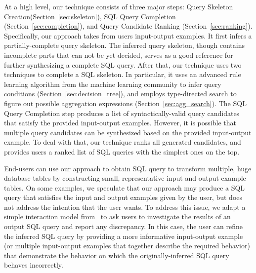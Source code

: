 At a high level, our technique consists of three major steps: Query Skeleton
Creation(Section~\ref{sec:skeleton}), SQL Query Completion
(Section~\ref{sec:completion}), and Query Candidate Ranking (Section~\ref{sec:ranking}).
Specifically, our approach takes from users input-output examples. It first infers
a partially-complete query skeleton. The inferred query skeleton, though contains
incomplete parts that can not be yet decided, serves as a good reference
for further synthesizing a complete SQL query.
After that, our technique uses two techniques to complete a SQL skeleton.
In particular, it uses an advanced rule learning algorithm from the machine
learning community to infer query conditions (Section~\ref{sec:decision_tree}), and
 employs type-directed search to figure out possible aggregation
expressions (Section~\ref{sec:agg_search}).
The SQL Query Completion step produces a list of syntactically-valid
query candidates that satisfy the provided input-output examples.
However, it is possible that multiple query candidates can be synthesized based on the
provided input-output example. To deal with that, our technique
ranks all generated candidates,
and provides users a ranked list of SQL queries with the
simplest ones on the top. 


End-users can use our approach to obtain SQL query to transform
multiple, huge database tables by constructing small, representative
input and output example tables. On some examples, we speculate
that our approach
may produce a SQL query that satisfies the input and output examples
given by the user, but does not address the intention
that the user wants. To address this issue, we adapt a simple
interaction model from~\cite{Harris:2011} to ask users to investigate the results of
an output SQL query and report any discrepancy. In this case,
the user can refine the inferred SQL query by providing a more
informative input-output example (or multiple input-output examples
that together describe the required behavior) that demonstrate the behavior on
which the originally-inferred SQL query behaves incorrectly.










